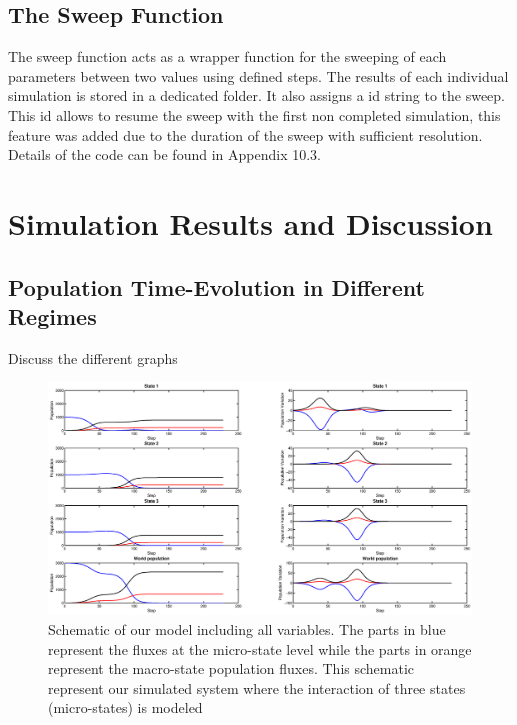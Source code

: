 \documentclass[11pt]{article} %
\begin{document}
\subsection{The Sweep Function}\indent

The sweep function acts as a wrapper function for the sweeping of each parameters between two values using defined steps. The results of each individual simulation is stored in a dedicated folder. It also assigns a id string to the sweep. This id allows to resume the sweep with the first non completed simulation, this feature was added due to the duration of the sweep with sufficient resolution. Details of the code can be found in Appendix 10.3.
\section{Simulation Results and Discussion}\indent

\subsection{Population Time-Evolution in Different Regimes}\indent
 
Discuss the different graphs
\begin{figure}[h!]
\centerline{
\includegraphics[scale=0.35]{Images/example_doomsday.eps}}
\caption{Schematic of our model including all variables. The parts in blue represent the fluxes at the micro-state level while the parts in orange represent the macro-state population fluxes. This schematic represent our simulated system where the interaction of three states (micro-states) is modeled \label{doomsday} }
\end{figure}
\end{document}
